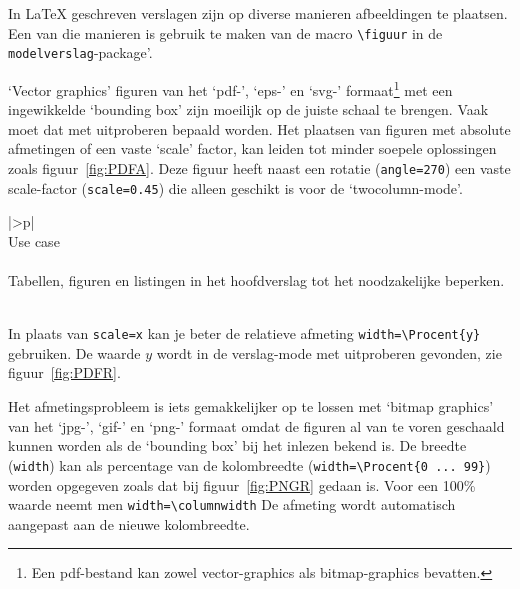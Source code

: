 	In \LaTeX{}\cite{lam1994} geschreven verslagen zijn op diverse manieren
	afbeeldingen\cite{Oos1996} te plaatsen. Een van die manieren is gebruik te
	maken van de macro \verb!\figuur! in de \verb!modelverslag!-package'.
	
	`Vector graphics' figuren van het `pdf-', `eps-' en `svg-'
	formaat\footnote{Een pdf-bestand kan zowel vector-graphics als
		bitmap-graphics bevatten.} met een ingewikkelde `bounding box' zijn
	moeilijk op de juiste schaal te brengen. Vaak moet dat met uitproberen
	bepaald worden. Het plaatsen van figuren met absolute afmetingen of
	een vaste `scale' factor, kan leiden tot minder soepele oplossingen
	zoals figuur~\ref{fig:PDFA}. Deze figuur heeft naast een rotatie
	(\verb!angle=270!)  een vaste scale-factor (\verb!scale=0.45!) die
	alleen geschikt is voor de `twocolumn-mode'.
	
	
	
	\begin{center}
		\begin{tabular}{|>\C p{}|}
			\hline
			~\\
			Use case\\
			~\\
			Tabellen, figuren en listingen in het hoofdverslag tot het
			noodzakelijke beperken.\\
			~\\
			\hline
		\end{tabular}
	\end{center}
	
	
	
	
	\begin{center}
		
	\end{center}
	
	
	
	In plaats van \verb!scale=x! kan je beter de relatieve afmeting
	\verb!width=\Procent{y}! gebruiken. De waarde $y$ wordt in de
	verslag-mode met uitproberen gevonden, zie figuur~\ref{fig:PDFR}.
	
	\begin{center}
		
	\end{center}
	
	
	Het afmetingsprobleem is iets gemakkelijker op te lossen met `bitmap
	graphics' van het `jpg-', `gif-' en `png-' formaat omdat de figuren al
	van te voren geschaald kunnen worden als de `bounding box' bij het
	inlezen bekend is. De breedte (\verb!width!) kan als percentage van de
	kolombreedte (\verb!width=\Procent{0 ... 99}!) worden opgegeven zoals
	dat bij figuur~\ref{fig:PNGR} gedaan is. Voor een 100\% waarde neemt
	men \verb!width=\columnwidth! De afmeting wordt automatisch
	aangepast aan de nieuwe kolombreedte.
	
